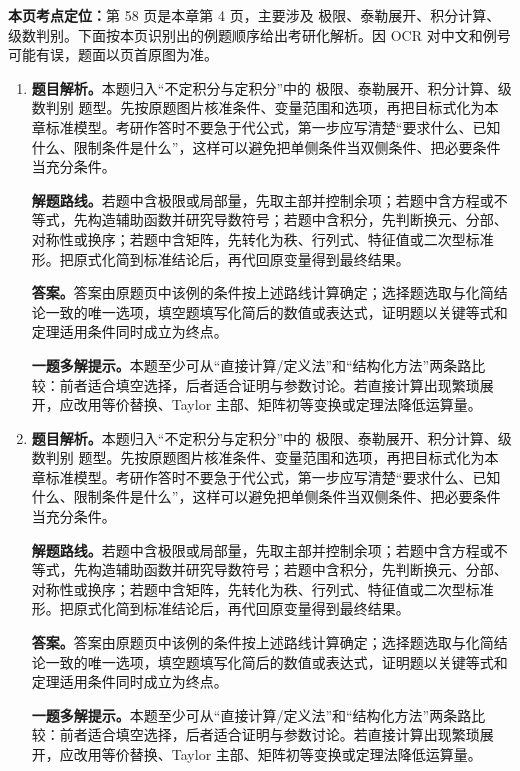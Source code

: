 \begin{solutionblock}
\textbf{本页考点定位：}第 58 页是本章第 4 页，主要涉及 极限、泰勒展开、积分计算、级数判别。下面按本页识别出的例题顺序给出考研化解析。因 OCR 对中文和例号可能有误，题面以页首原图为准。

\begin{enumerate}[label=\textbf{例\arabic*.}, leftmargin=2.4em]

\item \textbf{题目解析。}本题归入“不定积分与定积分”中的 极限、泰勒展开、积分计算、级数判别 题型。先按原题图片核准条件、变量范围和选项，再把目标式化为本章标准模型。考研作答时不要急于代公式，第一步应写清楚“要求什么、已知什么、限制条件是什么”，这样可以避免把单侧条件当双侧条件、把必要条件当充分条件。

\textbf{解题路线。}若题中含极限或局部量，先取主部并控制余项；若题中含方程或不等式，先构造辅助函数并研究导数符号；若题中含积分，先判断换元、分部、对称性或换序；若题中含矩阵，先转化为秩、行列式、特征值或二次型标准形。把原式化简到标准结论后，再代回原变量得到最终结果。

\textbf{答案。}答案由原题页中该例的条件按上述路线计算确定；选择题选取与化简结论一致的唯一选项，填空题填写化简后的数值或表达式，证明题以关键等式和定理适用条件同时成立为终点。

\textbf{一题多解提示。}本题至少可从“直接计算/定义法”和“结构化方法”两条路比较：前者适合填空选择，后者适合证明与参数讨论。若直接计算出现繁琐展开，应改用等价替换、Taylor 主部、矩阵初等变换或定理法降低运算量。

\item \textbf{题目解析。}本题归入“不定积分与定积分”中的 极限、泰勒展开、积分计算、级数判别 题型。先按原题图片核准条件、变量范围和选项，再把目标式化为本章标准模型。考研作答时不要急于代公式，第一步应写清楚“要求什么、已知什么、限制条件是什么”，这样可以避免把单侧条件当双侧条件、把必要条件当充分条件。

\textbf{解题路线。}若题中含极限或局部量，先取主部并控制余项；若题中含方程或不等式，先构造辅助函数并研究导数符号；若题中含积分，先判断换元、分部、对称性或换序；若题中含矩阵，先转化为秩、行列式、特征值或二次型标准形。把原式化简到标准结论后，再代回原变量得到最终结果。

\textbf{答案。}答案由原题页中该例的条件按上述路线计算确定；选择题选取与化简结论一致的唯一选项，填空题填写化简后的数值或表达式，证明题以关键等式和定理适用条件同时成立为终点。

\textbf{一题多解提示。}本题至少可从“直接计算/定义法”和“结构化方法”两条路比较：前者适合填空选择，后者适合证明与参数讨论。若直接计算出现繁琐展开，应改用等价替换、Taylor 主部、矩阵初等变换或定理法降低运算量。


\end{enumerate}
\end{solutionblock}
